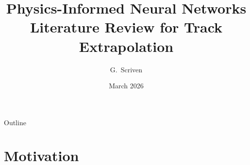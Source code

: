 \documentclass[aspectratio=169, 11pt]{beamer}
\title[PINN Literature Review]{%
  \textbf{Physics-Informed Neural Networks}\\[4pt]
  \large Literature Review for Track Extrapolation}
\author{G.~Scriven}
\institute{Maastricht University\quad$\cdot$\quad UHasselt\quad$\cdot$\quad LHCb}
\date{March 2026}
\begin{document}
\begin{frame}[plain]
  \titlepage
\end{frame}

\begin{frame}{Outline}
  \tableofcontents
\end{frame}

\section{Motivation}
\end{document}
